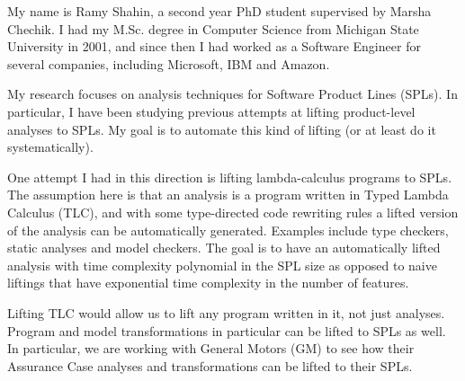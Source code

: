 \documentclass[11pt]{article}
\begin{document}
My name is Ramy Shahin, a second year PhD student supervised by Marsha Chechik. I had my M.Sc. degree in Computer Science from Michigan State University in 2001, and since then I had worked as a Software Engineer for several companies, including Microsoft, IBM and Amazon. 

My research focuses on analysis techniques for Software Product Lines (SPLs). In particular, I have been studying previous attempts at lifting product-level analyses to SPLs. My goal is to automate this kind of lifting (or at least do it systematically).

One attempt I had in this direction is lifting lambda-calculus programs to SPLs. The assumption here is that an analysis is a program written in Typed Lambda Calculus (TLC), and with some type-directed code rewriting rules a lifted version of the analysis can be automatically generated. Examples include type checkers, static analyses and model checkers. The goal is to have an automatically lifted analysis with time complexity polynomial in the SPL size as opposed to naive liftings that have exponential time complexity in the number of features.

Lifting TLC would allow us to lift any program written in it, not just analyses. Program and model transformations in particular can be lifted to SPLs as well. In particular, we are working with General Motors (GM) to see how their Assurance Case analyses and transformations can be lifted to their SPLs.
\end{document}
